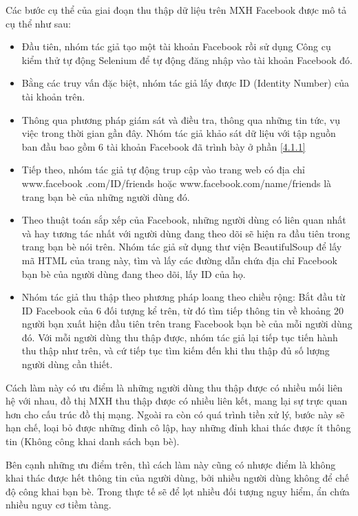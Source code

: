 Các bước cụ thể của giai đoạn thu thập dữ liệu trên MXH Facebook được mô tả cụ thể như sau:
\begin {itemize}
\item Đầu tiên, nhóm tác giả tạo một tài khoản Facebook rồi sử dụng Công cụ kiểm thử tự động Selenium để tự động đăng nhập vào tài khoản Facebook đó.

\item Bằng các truy vấn đặc biệt, nhóm tác giả lấy được ID (Identity Number) của tài khoản trên.

\item Thông qua phương pháp giám sát và điều tra, thông qua những tin tức, vụ việc trong thời gian gần đây. Nhóm tác giả khảo sát dữ liệu với tập nguồn ban đầu bao gồm 6 tài khoản Facebook đã trình bày ở phần \ref{4.1.1}

\item Tiếp theo, nhóm tác giả tự động trup cập vào trang web có địa chỉ www.facebook
.com/{ID}/friends hoặc www.facebook.com/{name}/friends là trang bạn bè của những người dùng đó.

\item Theo thuật toán sắp xếp của Facebook, những người dùng có liên quan nhất và hay tương tác nhất với người dùng đang theo dõi sẽ hiện ra đầu tiên trong trang bạn bè nói trên. Nhóm tác giả sử dụng thư viện BeautifulSoup để lấy mã HTML của trang này, tìm và lấy các đường dẫn chứa địa chỉ Facebook bạn bè của người dùng đang theo dõi, lấy ID của họ.

\item Nhóm tác giả thu thập theo phương pháp loang theo chiều rộng: Bắt đầu từ ID Facebook của 6 đối tượng kể trên, từ đó tìm tiếp thông tin về khoảng 20 người bạn xuất hiện đầu tiên trên trang Facebook bạn bè của mỗi người dùng đó. Với mỗi người dùng thu thập được, nhóm tác giả lại tiếp tục tiến hành thu thập như trên, và cứ tiếp tục tìm kiếm đến khi thu thập đủ số lượng người dùng cần thiết.
\end {itemize}		
Cách làm này có ưu điểm là những người dùng thu thập được có nhiều mối liên hệ với nhau, đồ thị MXH thu thập được có nhiều liên kết, mang lại sự trực quan hơn cho cấu trúc đồ thị mạng. Ngoài ra còn có quá trình tiền xử lý, bước này sẽ hạn chế, loại bỏ được những đỉnh cô lập, hay những đỉnh khai thác được ít thông tin (Không công khai danh sách bạn bè).

Bên cạnh những ưu điểm trên, thì cách làm này cũng có nhược điểm là không khai thác được hết thông tin của người dùng, bởi nhiều người dùng không để chế độ công khai bạn bè. Trong thực tế sẽ để lọt nhiều đối tượng nguy hiểm, ẩn chứa nhiều nguy cơ tiềm tàng.

